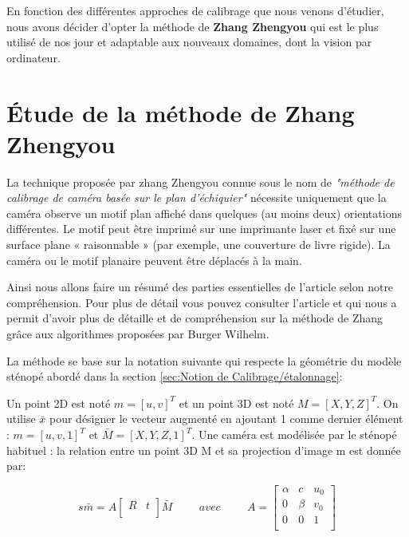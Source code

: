 \begin{itemize}[label={\Huge$\star$}]
\end{itemize}

 
 En fonction des différentes approches de calibrage que nous venons d'étudier, nous avons décider d'opter la méthode de \textbf{Zhang Zhengyou} \cite{zhengyou_zhang_flexible_1999} qui est le plus utilisé de nos jour et adaptable aux nouveaux domaines, dont la vision par ordinateur.
 
 \section{Étude de la méthode de Zhang Zhengyou}
 
  
 La technique proposée par zhang Zhengyou  \cite{zhengyou_zhang_flexible_1999} connue sous le nom de \textit{"méthode de calibrage de caméra basée sur le plan d'échiquier"} nécessite uniquement que la caméra observe un motif plan affiché dans quelques (au moins deux) orientations  différentes. Le motif peut être imprimé sur une imprimante laser et fixé  sur une surface plane « raisonnable » (par exemple, une couverture de livre rigide). La caméra ou le motif planaire peuvent être déplacés à la main.
 
 Ainsi nous allons faire un résumé des parties essentielles de l'article selon notre compréhension. Pour plus de détail vous pouvez consulter l'article \cite{zhengyou_zhang_flexible_1999} et \cite{burger_zhangs_2016} qui nous a permit d'avoir plus de détaille et de compréhension sur la méthode de Zhang grâce aux algorithmes proposées par Burger Wilhelm.
 
 La méthode se base sur la notation suivante qui respecte la géométrie du modèle sténopé abordé dans la section \ref{sec:Notion de  Calibrage/étalonnage}:
 
 Un point 2D est noté $m = [u, v]^{T}$ et un point 3D est noté $M = [X, Y, Z]^{T}$. On utilise $\bar{x}$ pour désigner le vecteur augmenté en ajoutant 1 comme dernier élément : $m =[u, v, 1]^{T}$ et $\bar{M} = [X, Y, Z, 1]^{T}$. Une caméra est modélisée par le sténopé habituel : la relation entre un point 3D M et sa projection d'image m est donnée par:
 
 
 \begin{equation}
 s\bar{m}= A\left[ 
 \begin{array}{cc}
 	R & t \\
 \end{array} \right]\bar{M}
 \hspace{1cm} 
  avec 
  \hspace{1cm} 
  A
  =
  \left[ 
  \begin{array}{ccc}
  	\alpha & c & u_0 \\
  	0 & \beta & v_0\\
  	0 & 0 & 1 \\
  \end{array} \right] 
  \label{eq:notation}
\end{equation}
   
